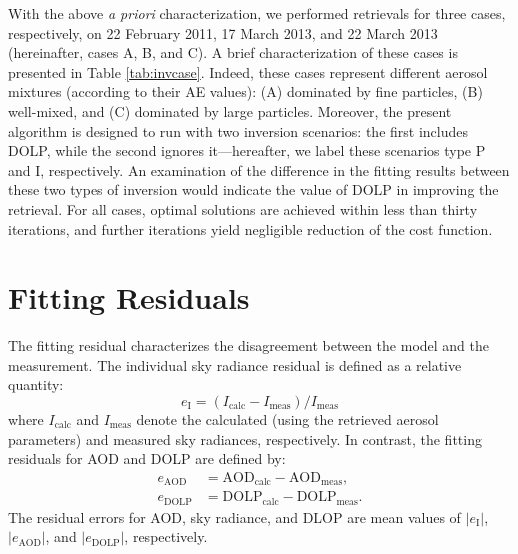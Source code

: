 With the above \textit{a priori} characterization, we performed retrievals for three
cases, respectively, on 22 February 2011, 17 March 2013, and 22 March 2013
(hereinafter, cases A, B, and C). A brief characterization of these cases is
presented in Table \ref{tab:invcase}. Indeed, these cases represent different 
aerosol mixtures (according to their AE values): (A) dominated by 
fine particles, (B) well-mixed, and (C) dominated by large particles. 
Moreover, the present algorithm is designed to run with two inversion 
scenarios: the first includes DOLP, while the second ignores
it---hereafter, we label these scenarios type P and I, respectively. An
examination of the difference in the fitting results between these two types of
inversion would indicate the value of DOLP in improving the retrieval. For all
cases, optimal solutions are achieved within less than thirty iterations, and
further iterations yield negligible reduction of the cost function. 

\section{Fitting Residuals} \label{sec:invfit}

The fitting residual characterizes the disagreement between the model and the
measurement. The individual sky radiance residual is defined as a relative
quantity: 
\begin{equation}
e_\text{I}=(I_\text{calc}-I_\text{meas})/I_\text{meas}
\end{equation}
where $I_\text{calc}$ and $I_\text{meas}$ denote the calculated (using the 
retrieved aerosol parameters) and measured sky radiances, respectively. 
In contrast, the fitting residuals for AOD and DOLP are defined by: 
\begin{align}
e_\text{AOD} &= \text{AOD}_\text{calc}-\text{AOD}_\text{meas}, \\
e_\text{DOLP} &= \text{DOLP}_\text{calc}-\text{DOLP}_\text{meas}.
\end{align}
The residual errors for AOD, sky radiance, and DLOP are mean values of
$|e_\text{I}|$, $|e_\text{AOD}|$, and $|e_\text{DOLP}|$, respectively.

